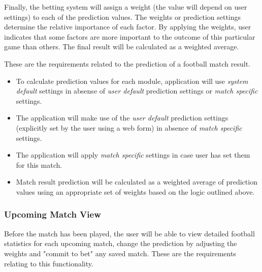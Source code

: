 Finally, the betting system will assign a weight (the value will depend on user settings) to each of the prediction values. The weights or prediction settings determine the relative importance of each factor. By applying the weights, user indicates that some factors are more important to the outcome of this particular game than others. The final result will be calculated as a weighted average.

These are the requirements related to the prediction of a football match result.

\begin{itemize}
  \item To calculate prediction values for each module, application will use \emph{system default} settings in absense of \emph{user default} prediction settings or \emph{match specific} settings.
  \item The application will make use of the \emph{user default} prediction settings (explicitly set by the user using a web form) in absence of \emph{match specific} settings.
  \item The application will apply \emph{match specific} settings in case user has set them for this match.
  \item Match result prediction will be calculated as a weighted average of prediction values using an appropriate set of weights based on the logic outlined above.
\end{itemize}

\subsubsection{Upcoming Match View}
\label{subsubsec:upcomingmatch_req}
Before the match has been played, the user will be able to view detailed football statistics for each upcoming match, change the prediction by adjusting the weights and "commit to bet" any saved match. These are the requirements relating to this functionality.

